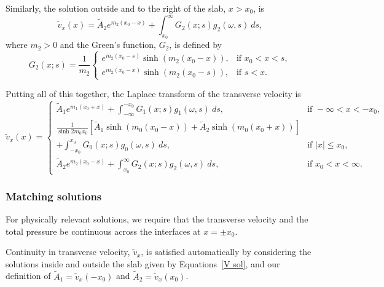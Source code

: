 Similarly, the solution outside and to the right of the slab, $x > x_0$, is
\begin{equation}
\tilde{v}_x(x) = \tilde{A}_2e^{m_2(x_0-x)} + \int_{x_0}^{\infty} G_2(x; s) g_2(\omega, s) ~ds,
\label{P sol 2}
\end{equation}
where $m_2 > 0$ and the Green's function, $G_2$, is defined by
\begin{equation}
G_2(x; s) = \frac{1}{m_2}
\begin{cases}
e^{m_2(x_0 - s)}\sinh(m_2(x_0 - x)), & \text{if } x_0 < x < s, \\
e^{m_2(x_0 - x)}\sinh(m_2(x_0 - s)), & \text{if } s < x.
\end{cases}
\end{equation}

Putting all of this together, the Laplace transform of the transverse velocity is
\begin{equation}
\tilde{v}_x(x) = 
\begin{cases}
\tilde{A}_1e^{m_1(x_0 + x)} + \int_{-\infty}^{-x_0} G_1(x; s) g_1(\omega, s) ~ds, & \text{if } -\infty < x < -x_0, \\

\frac{1}{\sinh{2m_0x_0}} \left[ \tilde{A}_1\sinh(m_0(x_0 - x)) + \tilde{A}_2\sinh(m_0(x_0 + x)) \right]  \\
+ \int_{-x_0}^{x_0} G_0(x; s) g_0(\omega, s) ~ds, & \text{if } |x| \leq x_0, \\

\tilde{A}_2e^{m_2(x_0 - x)} + \int_{x_0}^{\infty} G_2(x; s) g_2(\omega, s) ~ds, & \text{if } x_0 < x < \infty.
\end{cases}
\label{V sol}
\end{equation}


\subsubsection{Matching solutions}

For physically relevant solutions, we require that the transverse velocity and the total pressure be continuous across the interfaces at $x = \pm x_0$.

Continuity in transverse velocity, $\tilde{v}_x$, is satisfied automatically by considering the solutions inside and outside the slab given by Equations~\eqref{V sol}, and our definition of $\tilde{A}_1 = \tilde{v}_x(-x_0)$ and $\tilde{A}_2 = \tilde{v}_x(x_0)$.

